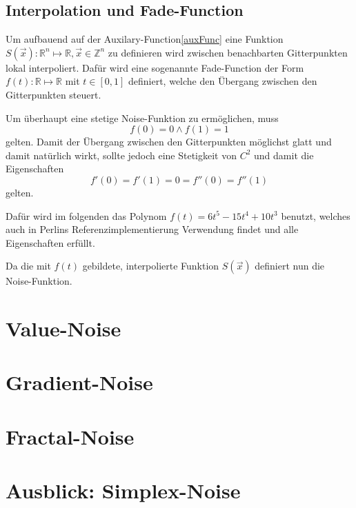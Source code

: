 \subsection{Interpolation und Fade-Function}
Um aufbauend auf der Auxilary-Function\ref{auxFunc} eine Funktion $S(\vec{x}): \mathbb{R}^n\mapsto\mathbb{R}, \vec{x}\in \mathbb{Z}^n$\label{S} zu definieren wird zwischen benachbarten Gitterpunkten lokal interpoliert. Dafür wird eine sogenannte Fade-Function\cite{fadeFunction} der Form $f(t): \mathbb{R}\mapsto\mathbb{R}$ mit $t\in[0, 1]$ definiert, welche den Übergang zwischen den Gitterpunkten steuert.

Um überhaupt eine stetige Noise-Funktion zu ermöglichen, muss 
\begin{equation}
f(0) = 0 \land f(1) = 1
\end{equation} gelten.
Damit der Übergang zwischen den Gitterpunkten möglichst glatt und damit natürlich wirkt, sollte jedoch eine Stetigkeit von $C^2$ und damit die Eigenschaften 
\begin{equation}
	f'(0) = f'(1) = 0 = f''(0) = f''(1)
\end{equation} 
gelten.

Dafür wird im folgenden das Polynom $f(t) = 6t^5-15t^4+10t^3$ benutzt, welches auch in Perlins Referenzimplementierung Verwendung findet\cite{BurgerGradientNoise2008} und alle Eigenschaften erfüllt.

Da die mit $f(t)$ gebildete, interpolierte Funktion $S(\vec{x})$ definiert nun die Noise-Funktion.


\section{Value-Noise}\label{Value-Noise}

\section{Gradient-Noise}\label{Gradient-Noise}

\section{Fractal-Noise}\label{Fractal-Noise}

\section{Ausblick: Simplex-Noise}\label{Simplex-Noise}






